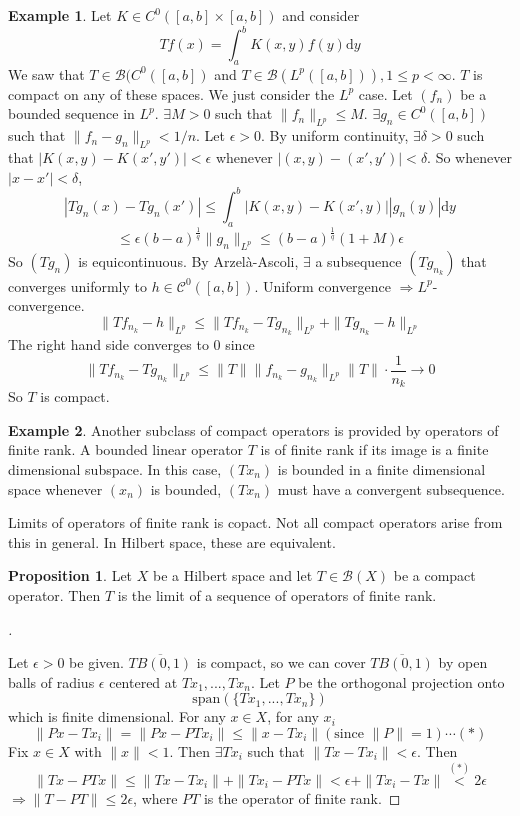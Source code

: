 \documentclass{article}
\theoremstyle{definition}
\newtheorem{ex}{Example}
\newtheorem{prop}{Proposition}
\newenvironment{proofs}[1][\proofname]{%
  \begin{proof}[#1]$ $\par\nobreak\ignorespaces
}{%
  \end{proof}
}
\newcommand{\B}{\mathcal B}
\newcommand{\C}{\mathcal C}
\begin{document}
\begin{ex}
	Let $K \in C^0([a, b] \times [a, b])$ and consider 
	\[
		T f(x) = \int_a^b K(x, y) f(y) \mathrm{d} y
	\]
	We saw that $T \in \B(C^0([a, b])$ and $T \in \B(L^p([a, b])), 1 \leq p < \infty$.
	$T$ is compact on any of these spaces.
	We just consider the $L^p$ case.
	Let $(f_n)$ be a bounded sequence in $L^p$.
	$\exists M > 0$ such that $\|f_n\|_{L^p} \leq M$.
	$\exists g_n \in C^0([a, b])$ such that $\|f_n - g_n\|_{L^p} < 1/n$.
	Let $\epsilon > 0$.
	By uniform continuity, $\exists \delta > 0$ such that $|K(x, y) - K(x', y')| < \epsilon$ whenever $|(x, y) - (x', y')| < \delta$.
	So whenever $|x - x'| < \delta$, 
	\[
		|T g_n(x) - T g_n(x')| \leq \int_a^b |K(x, y) - K(x', y)| |g_n(y)| \mathrm{d} y
	\]
	\[
		\leq \epsilon (b - a)^{\frac{1}{q}} \|g_n\|_{L^p} \leq (b - a)^{\frac{1}{q}} (1 + M)\epsilon
	\]
	So $(T g_n)$ is equicontinuous.
	By Arzel\`a-Ascoli, $\exists$ a subsequence $(T g_{n_k})$ that converges uniformly to $h \in \C^0([a, b])$.
	Uniform convergence $\Rightarrow L^p$-convergence.
	\[
		\|T f_{n_k} - h\|_{L^p} \leq \|T f_{n_k} - T g_{n_k}\|_{L^p} + \|T g_{n_k} - h \|_{L^p} 
	\]
	The right hand side converges to 0 since
	\[
		\|T f_{n_k} - T g_{n_k}\|_{L^p} \leq \|T\|\|f_{n_k} - g_{n_k}\|_{L^p}  \|T\| \cdot \frac{1}{n_k} \to 0
	\]
	So $T$ is compact.
\end{ex}

\begin{ex}
	Another subclass of compact operators is provided by operators of finite rank.
	A bounded linear operator $T$ is of finite rank if its image is a finite dimensional subspace.
	In this case, $(T x_n)$ is bounded in a finite dimensional space whenever $(x_n)$ is bounded, $(T x_n)$ must have a convergent subsequence.
\end{ex}

Limits of operators of finite rank is copact.
Not all compact operators arise from this in general.
In Hilbert space, these are equivalent.

\begin{prop}
	Let $X$ be a Hilbert space and let $T \in \B(X)$ be a compact operator.
	Then $T$ is the limit of a sequence of operators of finite rank.
\end{prop}

\begin{proofs}
	Let $\epsilon > 0$ be given.
	$\overline{TB(0, 1)}$ is compact, so we can cover $\overline{TB(0, 1)}$ by open balls of radius $\epsilon$ centered at $T x_1, ..., T x_n$.
	Let $P$ be the orthogonal projection onto 
	\[
		\text{span}(\{T x_1, ..., T x_n\})
	\]
	which is finite dimensional.
	For any $x \in X$, for any $x_i$
	\[
		\|P x - T x_i\| = \|P x - P T x_i\| \leq \|x - T x_i\| (\text{since } \|P\| = 1) \cdots (*)
	\]
	Fix $x \in X$ with $\|x\| < 1$.
	Then $\exists T x_i$ such that $\|T x - T x_i\| < \epsilon$.
	Then 
	\[
		\| T x - P T x\| \leq \|T x - T x_i\| + \| T x_i - P T x\| < \epsilon + \|T x_i - T x\| \stackrel{(*)}{<} 2 \epsilon 
	\]
	$\Rightarrow \|T - P T\| \leq 2 \epsilon$, where $PT$ is the operator of finite rank.
\end{proofs}
\end{document}
